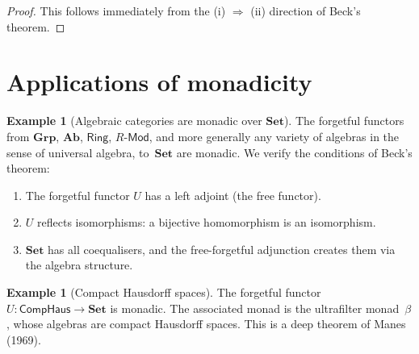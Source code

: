 \documentclass[a4paper,12pt]{book}
\newcommand{\Set}{\mathbf{Set}}
\newcommand{\Grp}{\mathbf{Grp}}
\newcommand{\Ab}{\mathbf{Ab}}
\theoremstyle{definition}
\newtheorem{example}[definition]{Example}
\theoremstyle{plain}
\theoremstyle{remark}
\begin{document}
\begin{proof}
This follows immediately from the (i) $\Rightarrow$ (ii) direction
of Beck's theorem.
\end{proof}


\section{Applications of monadicity}\label{sec:monadicity-apps}

\begin{example}[Algebraic categories are monadic over $\Set$]%
\label{ex:monadic-algebraic}
The forgetful functors from $\Grp$, $\Ab$, $\mathsf{Ring}$,
$R\text{-}\mathsf{Mod}$, and more generally any variety of
algebras in the sense of universal algebra, to~$\Set$ are monadic.
We verify the conditions of Beck's theorem:
\begin{enumerate}[label=(\alph*)]
\item The forgetful functor $U$ has a left adjoint (the free functor).
\item $U$ reflects isomorphisms: a bijective homomorphism is an
    isomorphism.
\item $\Set$ has all coequalisers, and the free-forgetful adjunction
    creates them via the algebra structure.
\end{enumerate}
\end{example}

\begin{example}[Compact Hausdorff spaces]\label{ex:monadic-comphaus}
The forgetful functor $U\colon\mathsf{CompHaus}\to\Set$ is monadic.
The associated monad is the ultrafilter monad~$\beta$, whose
algebras are compact Hausdorff spaces.  This is a deep theorem of
Manes (1969).
\end{example}
\end{document}

